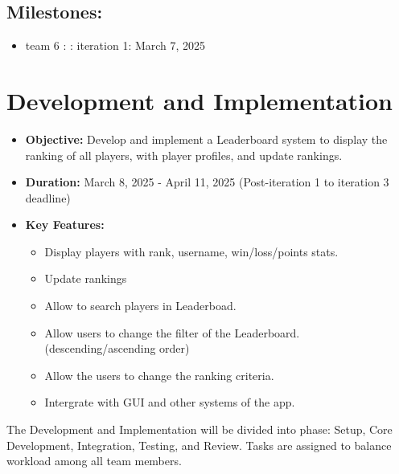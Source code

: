 \documentclass{report}
\begin{document}
\subsection*{Milestones:}
\begin{itemize}
    \item team 6 : : iteration 1: March 7, 2025
\end{itemize}
\section{Development and Implementation}
\begin{itemize}
    \item \textbf{Objective:} Develop and implement a Leaderboard system to display the ranking of all players, with player profiles, and update rankings.
    \item \textbf{Duration:} March 8, 2025 - April 11, 2025 (Post-iteration 1 to iteration 3 deadline)
    \item \textbf{Key Features:}
    \begin{itemize}
        \item Display players with rank, username, win/loss/points stats.
        \item Update rankings
        \item Allow to search players in Leaderboad.
        \item Allow users to change the filter of the Leaderboard. (descending/ascending order)
        \item Allow the users to change the ranking criteria.
        \item Intergrate with GUI and other systems of the app.
    \end{itemize}
\end{itemize}
The Development and Implementation will be divided into phase: Setup, Core Development, Integration, Testing, and Review. Tasks are assigned to balance workload among all team members.
\end{document}
